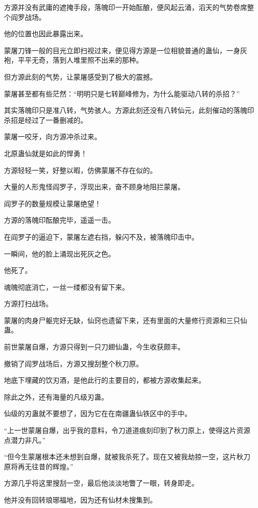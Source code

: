 \begin{this_body}
方源并没有武庸的遮掩手段，落魄印一开始酝酿，便风起云涌，滔天的气势卷席整个阎罗战场。

他的位置也因此暴露出来。

蒙屠刀锋一般的目光立即扫视过来，便见得方源是一位相貌普通的蛊仙，一身灰袍，平平无奇，落到人堆里照不出来的那种。

但方源此刻的气势，让蒙屠感受到了极大的震撼。

蒙屠甚至都有些茫然：“明明只是七转巅峰修为，为什么能驱动八转的杀招？”

其实落魄印只是准八转，气势骇人。方源此刻还没有八转仙元，此刻催动的落魄印杀招是经过了一番删减的。

蒙屠一咬牙，向方源冲杀过来。

北原蛊仙就是如此的悍勇！

方源轻轻一笑，好整以暇，仿佛蒙屠不存在似的。

大量的人形鬼怪阎罗子，浮现出来，奋不顾身地阻拦蒙屠。

阎罗子的数量规模让蒙屠绝望！

方源的落魄印酝酿完毕，遥遥一击。

在阎罗子的逼迫下，蒙屠左遮右挡，躲闪不及，被落魄印击中。

一瞬间，他的脸上涌现出死灰之色。

他死了。

魂魄彻底消亡，一丝一缕都没有留下来。

方源打扫战场。

蒙屠的肉身尸躯完好无缺，仙窍也遗留下来，还有里面的大量修行资源和三只仙蛊。

前世蒙屠自爆，方源只得到一只刀翅仙蛊，今生收获颇丰。

撤销了阎罗战场后，方源又搜刮整个秋刀原。

地底下埋藏的饮刃酒，是他此行的主要目的，都被方源收集起来。

除此之外，还有海量的凡级刃蛊。

仙级的刃蛊就不要想了，因为它在在南疆蛊仙铁区中的手中。

“上一世蒙屠自爆，出乎我的意料，令刀道道痕刻印到了秋刀原上，使得这片资源点潜力非凡。”

“但今生蒙屠根本还未想到自爆，就被我杀死了。现在又被我劫掠一空，这片秋刀原将再无往昔的辉煌。”

方源几乎将这里搜刮一空，最后他淡淡地瞥了一眼，转身即走。

他并没有回转琅琊福地，因为还有仙材未搜集到。


\end{this_body}
